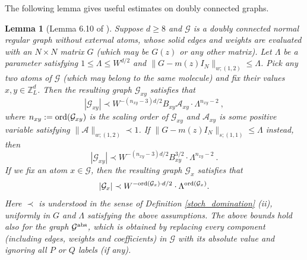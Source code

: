 \documentclass{article}
\newcommand{\1}{\mathds{1}}
\numberwithin{equation}{section}
\newcommand{\ord}{{\rm{ord}}}
\newcommand{\be}{\begin{equation}}
\newcommand{\ee}{\end{equation}}
\newcommand{\e}{{\varepsilon}}
\renewcommand{\cal}{\mathcal}
\newcommand{\wt}{\widetilde}
\renewcommand{\leq}{\leqslant}
\renewcommand{\geq}{\geqslant}
\renewcommand{\le}{\leq}
\renewcommand{\ge}{\geq}
\newcommand{\Z}{\mathbb{Z}}
\theoremstyle{plain} %
\newtheorem{lemma}[theorem]{Lemma}
\theoremstyle{remark}
\begin{document}


The following lemma gives useful estimates on doubly connected graphs.
\begin{lemma}[Lemma 6.10 of \cite{PartI_high}]\label{no dot}
Suppose $d\ge 8$ and $\cal G$ is a doubly connected normal regular graph without external atoms, whose solid edges and weights are evaluated with an $N\times N$ matrix $G$ (which may be $G(z)$ or any other matrix). Let $\Lambda$ be a parameter satisfying $1\le \Lambda\le W^{d/2}$ and $\|G-m(z)I_N\|_{w;(1,2)}\le \Lambda$. Pick any two atoms of $\cal G$ (which may belong to the same molecule) and fix their values $x , y\in \Z_L^d$. Then the resulting graph $\cal G_{xy}$ satisfies that %
\be\label{bound 2net1}
\left|\cal G_{xy}\right| \prec W^{ - \left(n_{xy}-3\right)d/2 } B_{xy} \cal A_{xy} \cdot \Lambda^{n_{xy}-2} \ ,
\ee
where  $n_{xy}:=\ord(\cal G_{xy})$ is the scaling order of $\cal G_{xy}$ and  $\cal A_{xy}$ is some positive variable satisfying $\|\cal A\|_{w;(1,2)}\prec 1$. If $\|G-m(z)I_N\|_{s;(1,1)}\le \Lambda$ instead, then 
\be\label{bound 2net1 strong}
\left|\cal G_{xy}\right| \prec W^{ -  \left(n_{xy}-3\right)d/2} B_{xy}^{3/2}\cdot \Lambda^{n_{xy}-2}\ .
\ee
If we fix an atom $x \in \cal G$, then the resulting graph  $\cal G_{x}$ satisfies that  
\be\label{bound 2net1 singlex}
\left|\cal G_{x}\right| \prec W^{ - \ord(\cal G_{x}) \cdot d/2 }  \cdot \Lambda^{\ord(\cal G_{x})} .
\ee
Here $\prec$ is understood in the sense of Definition \ref{stoch_domination} (ii), uniformly in $G$ and $\Lambda$ satisfying the above assumptions. The above bounds hold also for the graph $ {\cal G}^{{\rm abs}}$, which is obtained by replacing every component (including edges, weights and coefficients) in $\cal G$ with its absolute value and ignoring all $P$ or $Q$ labels (if any). 
\end{lemma}
\end{document}
